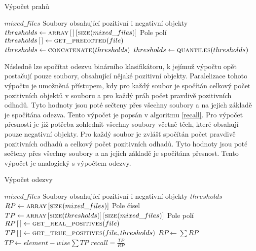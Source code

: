 \begin{algorithm}
	\caption{Výpočet prahů}
	\label{thresholds}
	\begin{algorithmic}
		\Require $ mixed\_files $ \Comment Soubory obsahující pozitivní i negativní objekty
		\Statex
		\State $ thresholds \gets \Call{array}{} \left[ \, \right] \left[ \Call{size}{mixed\_files} \right] $ \Comment Pole polí
			\State $ thresholds \left[ \, \right] \gets \Call{get\_predicted}{file} $
		\EndFor
		\State $ thresholds \gets \Call{concatenate}{thresholds} $
		\State $ thresholds \gets \Call{quantiles}{thresholds} $
	\end{algorithmic}
\end{algorithm}

Následně lze spočítat odezvu binárního klasifikátoru, k jejímuž výpočtu opět postačují pouze soubory, obsahující nějaké pozitivní objekty. Paralelizace tohoto výpočtu je umožněná	přístupem, kdy pro každý soubor je spočítán celkový počet pozitivních objektů v souboru a pro každý práh počet pravdivě pozitivních odhadů. Tyto hodnoty jsou poté sečteny přes všechny soubory a na jejich základě je spočítána odezva. Tento výpočet je popsán v algoritmu \ref{recall}. Pro výpočet přesnosti je již potřeba zohlednit všechny soubory včetně těch, které obsahují pouze negativní objekty. Pro každý soubor je zvlášť spočítán počet pravdivě pozitivních odhadů a celkový počet pozitivních odhadů. Tyto hodnoty jsou poté sečteny přes všechny soubory a na jejich základě je spočítána přesnost. Tento výpočet je analogický s výpočtem odezvy. 

\begin{algorithm}
	\caption{Výpočet odezvy}
	\label{recall}
	\begin{algorithmic}
		\Require $ mixed\_files $ \Comment Soubory obsahující pozitivní i negativní objekty
		\Require $ thresholds $
		\Statex
		\State $ RP \gets \Call{array}{} \left[ \Call{size}{mixed\_files} \right] $ \Comment Pole čísel
		\State $ TP \gets \Call{array}{} \left[ \Call{size}{thresholds} \right] \left[ \Call{size}{mixed\_files} \right] $ \Comment Pole polí
		\ParallelFor{$ file \in mixed\_files $}
			\State $ RP \left[ \, \right] \gets \Call{get\_real\_positives}{file} $
			\State $ TP \left[ \, \right] \gets \Call{get\_true\_positives}{file, thresholds} $
		\EndFor
		\State $ RP \gets \sum RP $
		\State $ TP \gets element-wise \sum TP $
		\State $ recall = \frac{TP}{RP} $
	\end{algorithmic}
\end{algorithm}

